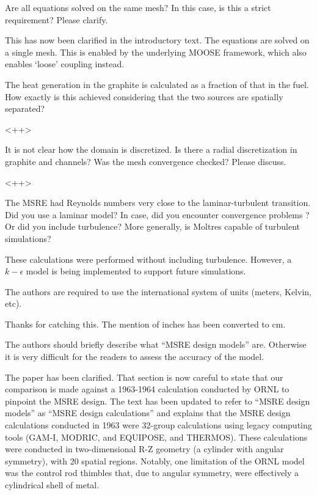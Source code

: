 \documentclass[answers,11pt]{exam}
\begin{document}
\begin{questions}
\question Are all equations solved on the same mesh? In this case, is this a strict requirement? Please clarify.
\begin{solution}
        This has now been clarified in the introductory text. The equations are
        solved on a single mesh. This is enabled by the underlying MOOSE
        framework, which also enables `loose' coupling instead.
\end{solution}

\question The heat generation in the graphite is calculated as a fraction of
that in the fuel. How exactly is this achieved considering that the two sources
are spatially separated?
\begin{solution}
        <++>
\end{solution}

\question It is not clear how the domain is discretized. Is there a radial
discretization in graphite and channels? Was the mesh convergence checked?
Please discuss.
\begin{solution}
       <++>
\end{solution}

\question The MSRE had Reynolds numbers very close to the laminar-turbulent
transition. Did you use a laminar model? In case, did you encounter convergence
problems ?  Or did you include turbulence? More generally, is Moltres capable of
turbulent simulations?
\begin{solution}
        These calculations were performed without including turbulence. However,
        a $k-\epsilon$ model is being implemented to support future simulations.
\end{solution}

\question The authors are required to use the international system of units (meters, Kelvin, etc).
\begin{solution}
        Thanks for catching this. The mention of inches has been converted to cm.
\end{solution}

\question The authors should briefly describe what ``MSRE design models''
are. Otherwise it is very difficult for the readers to assess the accuracy of
the model.
\begin{solution}
        The paper has been clarified. That section is now careful to state that
        our comparison is made against a 1963-1964 calculation conducted by ORNL
        to pinpoint the MSRE design. The text has been updated to refer to
        ``MSRE design models'' as ``MSRE design calculations'' and explains
        that the MSRE design calculations conducted in 1963 were 32-group
        calculations using legacy computing tools (GAM-I, MODRIC, and EQUIPOSE,
        and THERMOS). These calculations were conducted in two-dimensional R-Z
        geometry (a cylinder with angular symmetry), with 20 spatial regions.
        Notably, one limitation of the ORNL model was the control rod thimbles
        that, due to angular symmetry, were effectively a cylindrical shell of
        metal.
\end{solution}


\end{questions}
\end{document}
